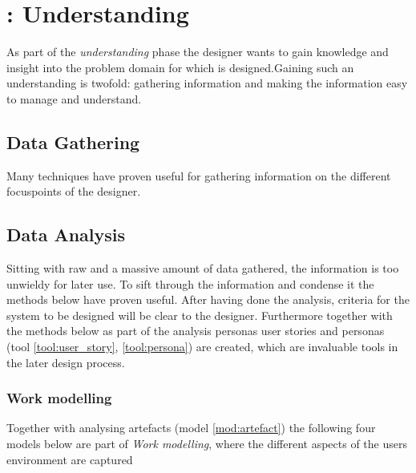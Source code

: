 \section{\todo : Understanding} \label{sec:understanding}
As part of the \emph{understanding} phase the designer wants to gain knowledge and insight into the problem domain for which is designed.Gaining such an understanding is twofold: gathering information and making the information easy to manage and understand.

\subsection{Data Gathering} \label{sec:data_gathering}
Many techniques have proven useful for gathering information on the different focuspoints of the designer.








\subsection{Data Analysis} \label{sec:data_analysis}
Sitting with raw and a massive amount of data gathered, the information is too unwieldy for later use. To sift through the information and condense it the methods below have proven useful. After having done the analysis, criteria for the system to be designed will be clear to the designer. Furthermore together with the methods below as part of the analysis personas user stories and personas (tool \ref{tool:user_story}, \ref{tool:persona}) are created, which are invaluable tools in the later design process.



\subsubsection{Work modelling}
Together with analysing artefacts (model \ref{mod:artefact}) the following four models below are part of \emph{Work modelling}, where the different aspects of the users environment are captured \cite[p. 277]{benyon10} 






